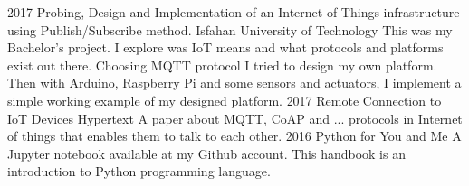 \documentclass[]{friggeri-cv}
\begin{document}
\begin{entrylist}
	\entry
	{2017}
	{Probing, Design and Implementation of an Internet of Things infrastructure using Publish/Subscribe method.}
	{Isfahan University of Technology}
	{This was my Bachelor's project. I explore was IoT means and what protocols and platforms exist out there. Choosing MQTT protocol I tried to design my own platform. Then with Arduino, Raspberry Pi and some sensors and actuators, I implement a simple working example of my designed platform.}
	\entry
	{2017}
	{Remote Connection to IoT Devices}
	{Hypertext}
	{A paper about MQTT, CoAP and ... protocols in Internet of things that enables them to talk to each other.}
	\entry
	{2016}
	{Python for You and Me}
	{}
	{A Jupyter notebook available at my Github account. This handbook is an introduction to Python programming language.}
\end{entrylist}
\end{document}
